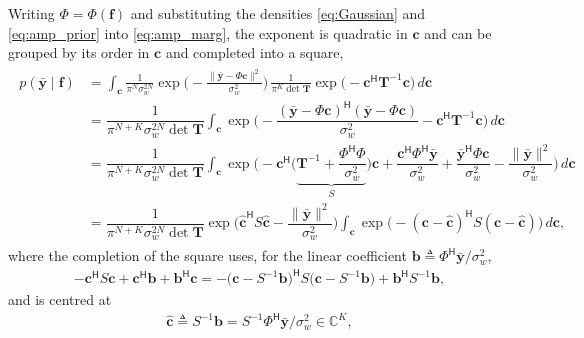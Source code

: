 \documentclass[journal,onecolumn]{IEEEtran}
\begin{document}
Writing $\Phi=\Phi(\mathbf{f})$ and substituting the densities \eqref{eq:Gaussian} and \eqref{eq:amp_prior} into \eqref{eq:amp_marg}, the exponent is quadratic in $\mathbf{c}$ and can be grouped by its order in $\mathbf{c}$ and completed into a square,
\begin{eqnarray}
\label{eq:quadform}
    \begin{array}{rl}
     p(\bar{\mathbf{y}}\mid\mathbf{f})
     & = \displaystyle\int_{\mathbf{c}} \frac{1}{\pi^{N}\sigma_w^{2N}}
         \exp\Big(-\frac{\|\bar{\mathbf{y}}-\Phi\mathbf{c}\|^{2}}{\sigma_w^{2}}\Big)\,
         \frac{1}{\pi^{K}\det\mathbf{T}}
         \exp\big(-\mathbf{c}^{\mathsf H}\mathbf{T}^{-1}\mathbf{c}\big)\,d\mathbf{c} \\[12pt]
     & = \dfrac{1}{\pi^{N+K}\sigma_w^{2N}\det\mathbf{T}}
         \displaystyle\int_{\mathbf{c}} \exp\Big(
         -\dfrac{(\bar{\mathbf{y}}-\Phi\mathbf{c})^{\mathsf H}(\bar{\mathbf{y}}-\Phi\mathbf{c})}{\sigma_w^{2}}
         - \mathbf{c}^{\mathsf H}\mathbf{T}^{-1}\mathbf{c}\Big)\,d\mathbf{c} \\[12pt]
     & = \dfrac{1}{\pi^{N+K}\sigma_w^{2N}\det\mathbf{T}}
         \displaystyle\int_{\mathbf{c}} \exp\Big(
         -\mathbf{c}^{\mathsf H}\Big(\underbrace{\mathbf{T}^{-1}+\dfrac{\Phi^{\mathsf H}\Phi}{\sigma_w^{2}}}_{\textstyle S}\Big)\mathbf{c}
         + \dfrac{\mathbf{c}^{\mathsf H}\Phi^{\mathsf H}\bar{\mathbf{y}}}{\sigma_w^{2}}
         + \dfrac{\bar{\mathbf{y}}^{\mathsf H}\Phi\mathbf{c}}{\sigma_w^{2}}
         - \dfrac{\|\bar{\mathbf{y}}\|^{2}}{\sigma_w^{2}}\Big)\,d\mathbf{c} \\[12pt]
     & = \dfrac{1}{\pi^{N+K}\sigma_w^{2N}\det\mathbf{T}}
         \exp\Big(\hat{\mathbf{c}}^{\mathsf H}S\hat{\mathbf{c}}-\dfrac{\|\bar{\mathbf{y}}\|^{2}}{\sigma_w^{2}}\Big)
         \displaystyle\int_{\mathbf{c}} \exp\big(-(\mathbf{c}-\hat{\mathbf{c}})^{\mathsf H}S(\mathbf{c}-\hat{\mathbf{c}})\big)\,d\mathbf{c},
    \end{array}
\end{eqnarray}
where the completion of the square uses, for the linear coefficient $\mathbf{b}\triangleq\Phi^{\mathsf H}\bar{\mathbf{y}}/\sigma_w^{2}$,
\begin{eqnarray}
\label{eq:square}
-\mathbf{c}^{\mathsf H}S\mathbf{c}+\mathbf{c}^{\mathsf H}\mathbf{b}+\mathbf{b}^{\mathsf H}\mathbf{c}
=-\big(\mathbf{c}-S^{-1}\mathbf{b}\big)^{\mathsf H}S\big(\mathbf{c}-S^{-1}\mathbf{b}\big)
+\mathbf{b}^{\mathsf H}S^{-1}\mathbf{b},
\end{eqnarray}
and is centred at
\begin{eqnarray}
\label{eq:chat_app}
\hat{\mathbf{c}}\triangleq S^{-1}\mathbf{b}=S^{-1}\Phi^{\mathsf H}\bar{\mathbf{y}}/\sigma_w^{2}\in\mathbb{C}^{K},
\end{eqnarray}
\end{document}
